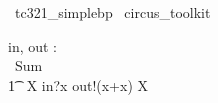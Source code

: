 
\begin{zsection}
  \SECTION\ tc321\_simplebp \parents\ circus\_toolkit
\end{zsection}

\begin{circus}
    \circchannel in, out : \nat   \\
    \circprocess\ Sum \circdef  \circbegin\  \\
    \t1 \circspot \circmu\ X \circspot in?x \then out!(x+x) \then X \\
    \circend
\end{circus}


